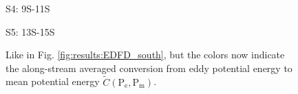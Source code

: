 \documentclass{ametsoc}
\begin{document}
\begin{figure}[h!]
	\centering
	\begin{minipage}[]{0.32\textwidth}
	\centering S4: 9S-11S \\
	\end{minipage}
	\begin{minipage}[]{0.32\textwidth}
\centering S5: 13S-15S \\		
	\end{minipage}
	\caption{Like in Fig. \ref{fig:results:EDFD_south}, but the colors now indicate the along-stream averaged conversion from eddy potential energy to mean potential energy $\tilde{C}(\text{P}_\text{e},\text{P}_\text{m})$.}
		\label{fig:results:conversion_south}
\end{figure}
\end{document}
